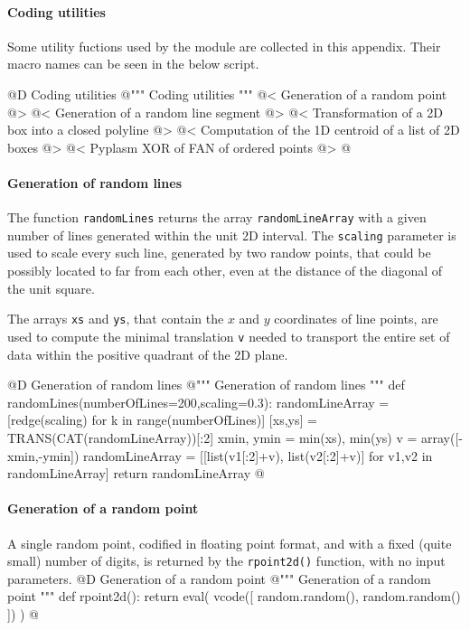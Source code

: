 \documentclass[11pt,oneside]{article}    %
\begin{document}
\paragraph{Coding utilities}

Some utility fuctions used by the module are collected in this appendix. Their macro names can be seen in the below script.

@D Coding utilities
@{""" Coding utilities """
@< Generation of a random point @>
@< Generation of a random line segment @>
@< Transformation of a 2D box into a closed polyline @>
@< Computation of the 1D centroid of a list of 2D boxes @>
@< Pyplasm XOR of FAN of ordered points @>
@}


\paragraph{Generation of random lines}
The function \texttt{randomLines} returns the array \texttt{randomLineArray} with a given number of lines generated within the unit 2D interval. The \texttt{scaling} parameter is used to scale every such line, generated by two randow points, that could be possibly located to far from each other, even at the distance of the diagonal of the unit square.

The arrays \texttt{xs} and \texttt{ys}, that contain the $x$ and $y$ coordinates of line points, are used to compute the minimal translation \texttt{v} needed to transport the entire set of data within the positive quadrant of the 2D plane. 

@D Generation of random lines
@{""" Generation of random lines """
def randomLines(numberOfLines=200,scaling=0.3):
    randomLineArray = [redge(scaling) for k in range(numberOfLines)]
    [xs,ys] = TRANS(CAT(randomLineArray))[:2]
    xmin, ymin = min(xs), min(ys)
    v = array([-xmin,-ymin])
    randomLineArray = [[list(v1[:2]+v), list(v2[:2]+v)] for v1,v2 in randomLineArray]
    return randomLineArray
@}


\paragraph{Generation of a random point}
A single random point, codified in floating point format, and with a fixed (quite small) number of digits, is returned by the \texttt{rpoint2d()} function, with no input parameters.
@D Generation of a random point
@{""" Generation of a random point """
def rpoint2d():
    return eval( vcode([ random.random(), random.random() ]) )
@}
    
\end{document}

